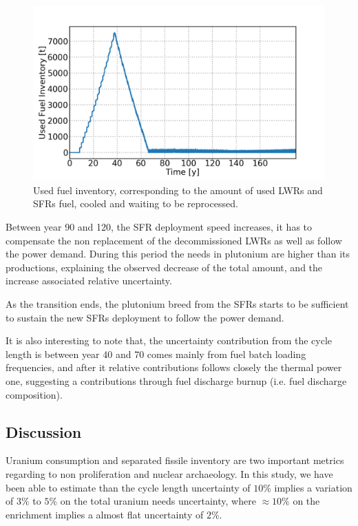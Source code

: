 \documentclass{anstrans}
\begin{document}
\begin{figure}[ht] %
    \centering
    \includegraphics[scale=0.18]{used_fuel}
    \caption{Used fuel inventory, corresponding to the amount of used
    \glspl{LWR} and \glspl{SFR} fuel, cooled and waiting to be reprocessed.}
    \label{fig:used_fuel}
\end{figure}
Between year 90 and 120, the \gls{SFR} deployment speed increases, it has to
compensate the non replacement of the decommissioned \glspl{LWR} as well as
follow the power demand.  During this period the needs in plutonium are higher
than its productions, explaining the observed decrease of the total amount, and
the increase associated relative uncertainty.

As the transition ends, the plutonium breed from the \glspl{SFR} starts to be
sufficient to sustain the new \glspl{SFR} deployment to follow the power demand.

It is also interesting to note that, the uncertainty contribution from the cycle
length is between year 40 and 70 comes mainly from fuel batch loading
frequencies, and after it relative contributions follows closely the thermal
power one, suggesting a contributions through fuel discharge burnup (i.e.  fuel
discharge composition).

\subsection{Discussion}

Uranium consumption and separated fissile inventory are two important metrics
regarding to non proliferation and nuclear archaeology.  In this study, we have
been able to estimate than the cycle length uncertainty of $10\%$ implies a
variation of $3\%$ to $5\%$ on the total uranium needs uncertainty, where $\approx10\%$
on the enrichment implies a almost flat uncertainty of $2\%$.
\end{document}
